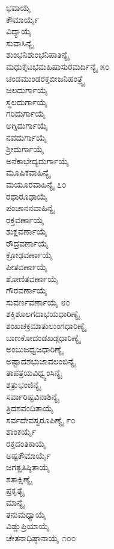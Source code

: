 \begin{multicols}{2}
ಭವಾಯೈ\\
ಕೌಮಾರ್ಯೈ\\
ವಿದ್ಯಾಯೈ\\
ಸುವಾಸಿನ್ಯೈ\\
ಶುಂಭನಿಶುಂಭನಿಪಾತಿನ್ಯೈ\\
ಮಧುಕೈಟಭಮಹಿಷಾಸುರಮರ್ದಿನ್ಯೈ ೫೦\\
ಚಂಡಮುಂಡರಕ್ತಬೀಜನಿಹಂತ್ರ್ಯೈ\\
ಜಲದುರ್ಗಾಯೈ\\
ಸ್ಥಲದುರ್ಗಾಯೈ\\
ಗರಿದುರ್ಗಾಯೈ\\
ಅಗ್ನಿದುರ್ಗಾಯೈ\\
ನವದುರ್ಗಾಯೈ\\
ಶ್ರೀದುರ್ಗಾಯೈ\\
ಅನೆಕಾಭೇದ್ಯದುರ್ಗಾಯೈ\\
ಮೂಷಿಕವಾಹಿನ್ಯೈ\\
ಮಯೂರವಾಹಿನ್ಯೈ ೭೦\\
ರಥಾರೂಢಾಯೈ\\
ಪಂಚಾನನವಾಹಿನ್ಯೈ\\
ರಕ್ತವರ್ಣಾಯೈ\\
ಶುಕ್ಲವರ್ಣಾಯೈ\\
ರೌದ್ರವರ್ಣಾಯೈ\\
ಕ್ರೋಢವರ್ಣಾಯೈ\\
ಪೀತವರ್ಣಾಯೈ\\
ಶೋಣಿತವರ್ಣಾಯೈ\\
ಗೌರವರ್ಣಾಯೈ\\
ಸುವರ್ಣವರ್ಣಾಯೈ ೮೦\\
ಶಕ್ತಿಶೂಲಗದಾಭಯಧಾರಿಣ್ಯೈ\\
ಶಂಖಚಕ್ರಮಾತುಲುಂಗಧಾರಿಣ್ಯೈ\\
ಬಾಣಕೋದಂಡಖಡ್ಗಧಾರಿಣ್ಯೈ\\
ಅಂಬುಜಧ್ವಜಧಾರಿಣ್ಯೈ\\
ಅಷ್ಟಾದಶಭುಜಾವಲಂಬಿನ್ಯೈ\\
ತಾಪತ್ರಯವಿಧ್ವ್ವಂಸಿನ್ಯೈ\\
ಶತ್ರುಭಂಜಿನ್ಯೈ\\
ಸರ್ವಾರಿಷ್ಟವಿನಾಶಿನ್ಯೈ\\
ತ್ರಿದಶವಂದಿತಾಯೈ\\
ಸರ್ವದೇವಸ್ವರೂಪಿಣ್ಯೈ ೯೦\\
ಶಾಂಕರ್ಯೈ\\
ರಕ್ತದಂತಿಕಾಯೈ\\
ಅಷ್ಟಕೌಮಾರ್ಯೈ\\
ಜಗತ್ಪ್ರತಿಷ್ಠಿತಾಯೈ\\
ಶತಾಕ್ಷಿಣ್ಯೈ\\
ಪ್ರಕೃತ್ಯೈ\\
ಮಾನ್ಯೈ\\
ತನುಮಧ್ಯಾಯೈ\\
ವಿಷ್ಣುಪ್ರಿಯಾಯೈ\\
ಚೇತನಾಧಿಷ್ಠಾನಾಯೈ ೧೦೦\\

\end{multicols}

